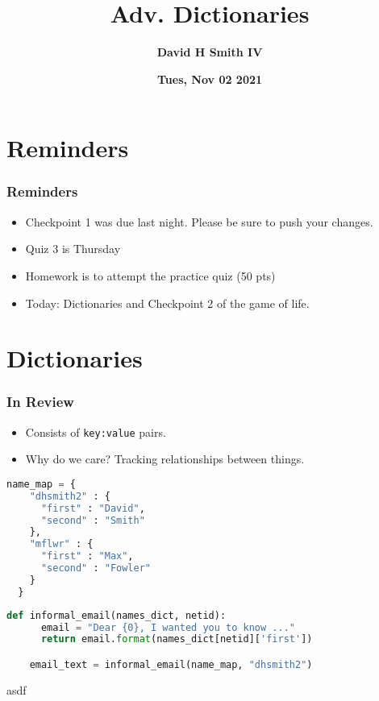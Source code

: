 \documentclass{beamer}
\title{\textbf{Adv. Dictionaries}}
\author{\textbf{David H Smith IV}}
\institute[\textbf{UIUC}]{\textbf{University of Illinois Urbana-Champaign}}
\date{\textbf{Tues, Nov 02 2021}}
\begin{document}
\frame{\titlepage}

\section{Reminders}

%
%
\begin{frame}
  \frametitle{Reminders}
  \begin{itemize}
    \item Checkpoint 1 was due last night. Please be sure to push your changes.
    \item Quiz 3 is Thursday
    \item Homework is to attempt the practice quiz (50 pts)
    \item Today: Dictionaries and Checkpoint 2 of the game of life.
  \end{itemize}
\end{frame}


\section{Dictionaries}

%
%
\begin{frame}[fragile]
  \frametitle{In Review} 
  \vfill
  \begin{minipage}{0.60\textwidth}
    \begin{itemize}
      \item Consists of \lstinline|key:value| pairs.
      \item Why do we care? Tracking relationships between things. 
    \end{itemize}
  \end{minipage}
  \begin{minipage}{0.39\textwidth} 
    \begin{lstlisting}[language=Python, autogobble]
  name_map = {
    "dhsmith2" : {
      "first" : "David",
      "second" : "Smith"
    },
    "mflwr" : {
      "first" : "Max",
      "second" : "Fowler"
    }
  }\end{lstlisting}
  \end{minipage}
  \vfill
  \begin{lstlisting}[language=Python, autogobble]
    def informal_email(names_dict, netid):
      email = "Dear {0}, I wanted you to know ..."
      return email.format(names_dict[netid]['first'])

    email_text = informal_email(name_map, "dhsmith2")
  \end{lstlisting}
  asdf
\end{frame}
\end{document}
